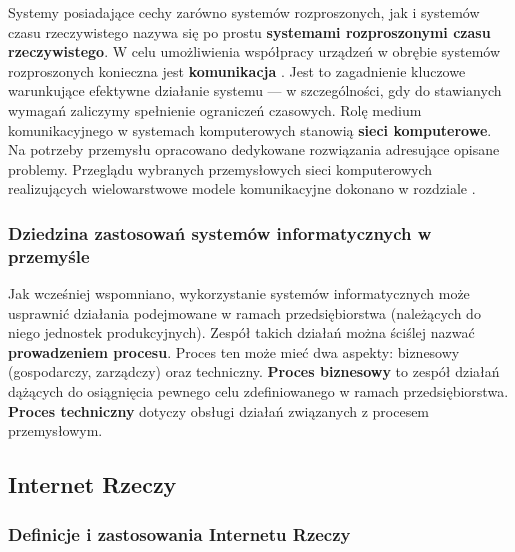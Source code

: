 \documentclass[a4paper, 12pt, twoside]{article}
\begin{document}
Systemy posiadające cechy zarówno systemów rozproszonych, jak i systemów
czasu rzeczywistego nazywa się po prostu \textbf{systemami rozproszonymi czasu rzeczywistego}.
W celu umożliwienia współpracy urządzeń w obrębie systemów rozproszonych konieczna
jest \textbf{komunikacja} \cite{isp-analiza-przepływu-informacji}. Jest to zagadnienie kluczowe warunkujące efektywne działanie
systemu --- w szczególności, gdy do stawianych wymagań zaliczymy spełnienie 
ograniczeń czasowych. Rolę medium komunikacyjnego
w systemach komputerowych stanowią \textbf{sieci komputerowe}. Na potrzeby 
przemysłu opracowano dedykowane rozwiązania adresujące opisane problemy.
Przeglądu wybranych przemysłowych sieci komputerowych realizujących wielowarstwowe
modele komunikacyjne dokonano w rozdziale .

\subsubsection{Dziedzina zastosowań systemów informatycznych w przemyśle}

Jak wcześniej wspomniano, wykorzystanie systemów informatycznych może usprawnić
działania podejmowane w ramach przedsiębiorstwa (należących do niego jednostek produkcyjnych). 
Zespół takich działań można ściślej nazwać \textbf{prowadzeniem procesu}.
Proces ten może mieć dwa aspekty: biznesowy (gospodarczy, zarządczy) oraz techniczny. 
\textbf{Proces biznesowy} to zespół działań dążących do osiągnięcia pewnego celu
zdefiniowanego w ramach przedsiębiorstwa. \textbf{Proces techniczny} dotyczy
obsługi działań związanych z procesem przemysłowym. 


\subsection{Internet Rzeczy}

\subsubsection{Definicje i zastosowania Internetu Rzeczy}
\end{document}
